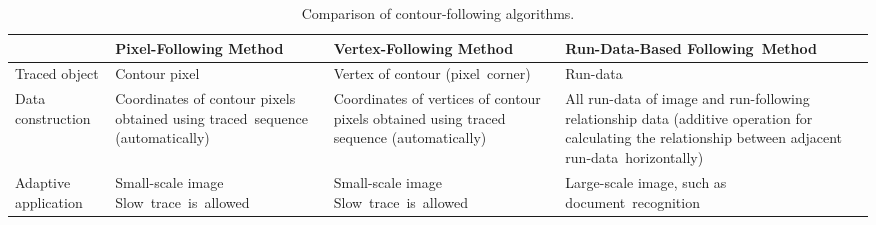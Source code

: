 \documentclass[sensors,article,accept,moreauthors,pdftex,10pt,a4paper]{mdpi}
\newcommand{\JHMEMO}[1]{\textcolor{red}{#1}}
\begin{document}
\begin{table}[H]
\footnotesize
\centering
	\begin{tabular}{C{2cm}C{3.5cm}C{3.5cm}C{4cm}}
		\toprule
		& \textbf{Pixel-Following \linebreak Method} & \textbf{Vertex-Following \linebreak Method} & \textbf{Run-Data-Based Following~Method} \\
		\midrule
		Traced object 		& Contour pixel & Vertex of contour (pixel~corner) & Run-data \\		\midrule
		Data construction 	& Coordinates of contour pixels obtained using traced\ sequence (automatically) 
 & Coordinates of vertices of contour pixels obtained using traced sequence (automatically)
 & All run-data of image and run-following relationship data 
(additive operation for calculating the relationship between adjacent run-data~horizontally) \\		\midrule
		Adaptive application \cite{Miyatake1997Contour}	& Small-scale image \mbox{Slow trace is allowed}
	& Small-scale image \mbox{Slow trace is allowed}	& Large-scale image, such as \mbox{document recognition} \\
		\bottomrule
	\end{tabular}
	\caption{Comparison of contour-following algorithms.}
	\label{table:relatedworks}
\end{table}



\end{document}

